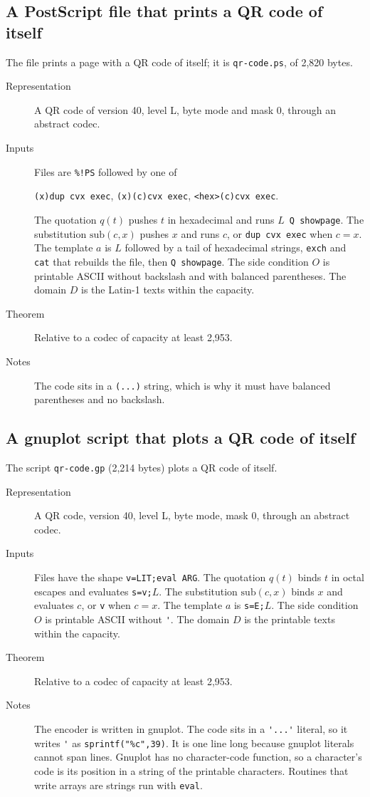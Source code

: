 \documentclass[11pt]{amsart}
\theoremstyle{definition}
\theoremstyle{remark}
\newcommand{\sub}{\mathrm{sub}}
\newcommand{\lean}[1]{\texttt{#1}}
\begin{document}
\subsection{A PostScript file that prints a QR code of itself}
The file prints a page with a QR code of itself; it is \lean{qr-code.ps}, of 2,820 bytes.
\begin{description}
\item[Representation] A QR code of version 40, level L, byte mode and mask 0,
through an abstract codec.
\item[Inputs] Files are \verb|%!PS| followed by one of
\begin{center}
\verb|(x)dup cvx exec|, \quad \verb|(x)(c)cvx exec|, \quad \verb|<hex>(c)cvx exec|.
\end{center}
The quotation $q(t)$ pushes $t$ in hexadecimal and runs $L$\verb| Q showpage|. The substitution
$\sub(c,x)$ pushes $x$ and runs $c$, or \verb|dup cvx exec| when $c = x$. The template $a$ is $L$
followed by a
tail of hexadecimal strings, \verb|exch| and \verb|cat| that rebuilds the file, then
\verb|Q showpage|. The side condition $O$ is printable ASCII without backslash and with balanced
parentheses. The domain $D$ is the Latin-1 texts within the capacity.
\item[Theorem] Relative to a codec of capacity at least 2,953.
\item[Notes] The code sits in a \verb|(...)| string, which is why it must have balanced
parentheses and no backslash.
\end{description}

\subsection{A gnuplot script that plots a QR code of itself}
The script \lean{qr-code.gp} (2,214 bytes) plots a QR code of itself.
\begin{description}
\item[Representation] A QR code, version 40, level L, byte mode, mask 0, through an abstract
codec.
\item[Inputs] Files have the shape \verb|v=LIT;eval ARG|. The quotation $q(t)$ binds $t$ in octal
escapes and evaluates \verb|s=v;|$L$. The substitution $\sub(c,x)$ binds $x$ and evaluates $c$, or
\verb|v| when $c = x$. The template $a$ is \verb|s=E;|$L$. The side condition $O$ is printable
ASCII without \verb|'|. The domain $D$ is the printable texts within the
capacity.
\item[Theorem] Relative to a codec of capacity at least 2,953.
\item[Notes] The encoder is written in gnuplot. The code sits in a \verb|'...'| literal, so it
writes \verb|'| as \verb|sprintf("%c",39)|. It is one line long because gnuplot literals cannot
span lines. Gnuplot has no character-code function, so a character's code is its position in a
string of the printable characters. Routines that write arrays are strings run with
\verb|eval|.
\end{description}
\end{document}
